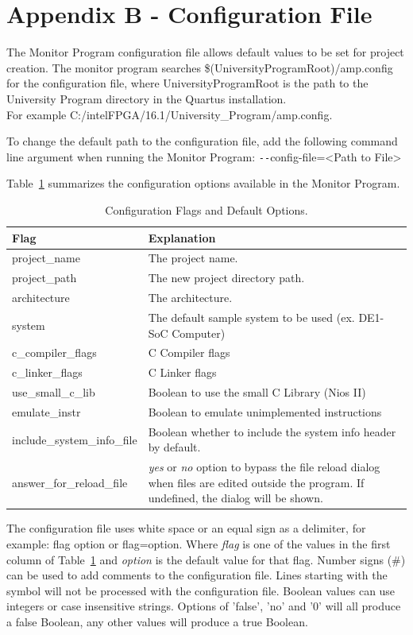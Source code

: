\documentclass[11pt, twoside, pdftex]{article}
\newcommand{\commonPath}{../../Common}
\begin{document}
\section{Appendix B - Configuration File}
The Monitor Program configuration file allows default values to be set for project creation. The monitor program searches 
{\sf \$(UniversityProgramRoot)/amp.config} for the configuration file, where {\sf UniversityProgramRoot} is the path to the 
University Program directory in the Quartus installation.\\
For example {\sf C:/intelFPGA/16.1/University\_Program/amp.config}.

To change the default path to the configuration file, add the following command line argument 
when running the Monitor Program: {\sf \texttt{-}\texttt{-}config-file=<Path to File>}

Table~\ref{tbl:2} summarizes the configuration options available in the Monitor Program.

\begin{table}[h]
    \centering
    \begin{tabular}{|l|p{5in}|}
        \hline
        Flag & Explanation\\
        \hline\hline
				\hline
				project\_name				& The project name.\\
				project\_path				& The new project directory path.\\
				architecture				& The architecture.\\
				system							& The default sample system to be used (ex. DE1-SoC Computer)\\
				c\_compiler\_flags	& C Compiler flags\\
				c\_linker\_flags		& C Linker flags\\
				use\_small\_c\_lib	& Boolean to use the small C Library (Nios II)\\
				emulate\_instr			& Boolean to emulate unimplemented instructions\\
				include\_system\_info\_file & Boolean whether to include the system info header by default.\\
				answer\_for\_reload\_file & {\it yes} or {\it no} option to bypass the file reload dialog when files are edited outside the program. If undefined, the dialog will be shown.\\
				\hline
    \end{tabular}
    \caption{Configuration Flags and Default Options.} 
		\label{tbl:2}
\end{table}

The configuration file uses white space or an equal sign as a delimiter, for example: 
{\sf flag	option} or {\sf flag=option}. Where {\it flag} is one of the values in the first column of 
Table~\ref{tbl:2} and {\it option} is the default value for that flag. Number signs 
(\#) can be used to add comments to the configuration file. Lines starting with the symbol will
not be processed with the configuration file. Boolean values can use integers or case insensitive strings. 
Options of 'false', 'no' and '0' will all produce a false Boolean, any other values will produce a true Boolean.




\end{document}
